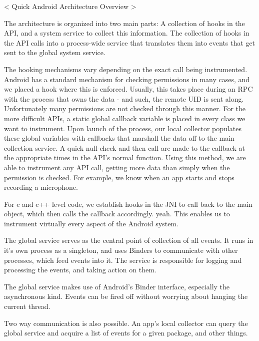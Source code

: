 < Quick Android Architecture Overview >

The architecture is organized into two main parts: A collection of hooks in the API, and a system service to collect this information. The collection of hooks in the API calls into a process-wide service that translates them into events that get sent to the global system service.

The hooking mechanisms vary depending on the exact call being instrumented. Android has a standard mechanism for checking permissions in many cases, and we placed a hook where this is enforced. Usually, this takes place during an RPC with the process that owns the data - and such, the remote UID is sent along. Unfortunately many permissions are not checked through this manner. For the more difficult APIs, a static global callback variable is placed in every class we want to instrument. Upon launch of the process, our local collector populates these global variables with callbacks that marshall the data off to the main collection service. A quick null-check and then call are made to the callback at the appropriate times in the API's normal function. Using this method, we are able to instrument any API call, getting more data than simply when the permission is checked. For example, we know when an app starts and stops recording a microphone.

For c and c++ level code, we establish hooks in the JNI to call back to the main object, which then calls the callback accordingly. yeah. This enables us to instrument virtually every aspect of the Android system.

The global service serves as the central point of collection of all events. It runs in it's own process as a singleton, and uses Binders to communicate with other processes, which feed events into it. The service is responsible for logging and processing the events, and taking action on them.

The global service makes use of Android's Binder interface, especially the asynchronous kind. Events can be fired off without worrying about hanging the current thread.

Two way communication is also possible. An app's local collector can query the global service and acquire a list of events for a given package, and other things.
